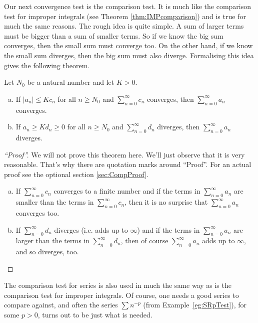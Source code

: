 Our next convergence test is the comparison test. It is much like
the comparison test for improper integrals (see Theorem \ref{thm:IMPcomparison})
and is true for much the same reasons.
The rough idea is quite simple. A sum of larger terms
must be bigger than a sum of smaller terms. So if we know the
big sum converges, then the small sum must converge too. On the other
hand, if we know the small sum diverges, then the big sum must also
diverge. Formalising this idea gives the following theorem.
\begin{theorem}\label{thm:SRcomparisonTest}
Let $N_0$ be a natural number and let $K>0$.
\begin{enumerate}[(a)]
\item If $|a_n|\le K c_n$ for all $n\ge N_0$ and
$\sum\limits_{n=0}^\infty c_n$ converges, then
$\sum\limits_{n=0}^\infty a_n$ converges.
\item If $a_n\ge K d_n\ge0 $ for all $n\ge N_0$ and
$\sum\limits_{n=0}^\infty d_n$ diverges, then
$\sum\limits_{n=0}^\infty a_n$ diverges.
\end{enumerate}
\end{theorem}

\begin{proof}[``Proof'']
We will not prove this theorem here. We'll just observe that it is very
reasonable. That's why there are quotation marks around ``Proof''.
For an actual proof see the optional section \ref{sec:CompProof}.
\begin{enumerate}[(a)]
\item If $\sum\limits_{n=0}^\infty c_n$ converges to a finite number
and if the terms in $\sum\limits_{n=0}^\infty a_n$ are smaller than the
terms in $\sum\limits_{n=0}^\infty c_n$, then it is no surprise that
$\sum\limits_{n=0}^\infty a_n$ converges too.

\item If $\sum\limits_{n=0}^\infty d_n$ diverges (i.e. adds up to $\infty$)
and if the terms in $\sum\limits_{n=0}^\infty a_n$ are larger than the
terms in $\sum\limits_{n=0}^\infty d_n$, then of course
$\sum\limits_{n=0}^\infty a_n$ adds up to $\infty$, and so diverges, too.
\end{enumerate}

\end{proof}

The comparison test for series is also used in much the same way as is
the comparison test for improper integrals. Of course, one needs a good
series to compare against, and often the series $\sum n^{-p}$ (from Example~\ref{eg:SRpTest}), for some $p>0$, turns out to be just
what is needed.

